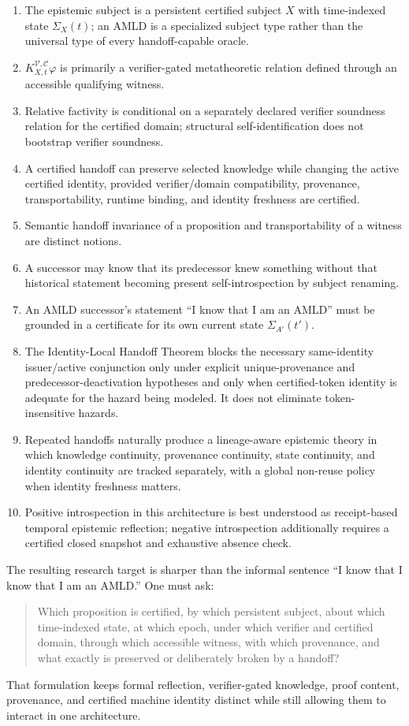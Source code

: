 \documentclass[11pt]{article}
\theoremstyle{remark}
\newcommand{\K}[4]{K^{#3,#4}_{#1,#2}}
\begin{document}
\begin{enumerate}[label=\textbf{C\arabic*.}]
\item The epistemic subject is a persistent certified subject $X$ with time-indexed state $\Sigma_X(t)$; an AMLD is a specialized subject type rather than the universal type of every handoff-capable oracle.
\item $\K{X}{t}{\mathcal V}{\mathcal C}\varphi$ is primarily a verifier-gated metatheoretic relation defined through an accessible qualifying witness.
\item Relative factivity is conditional on a separately declared verifier soundness relation for the certified domain; structural self-identification does not bootstrap verifier soundness.
\item A certified handoff can preserve selected knowledge while changing the active certified identity, provided verifier/domain compatibility, provenance, transportability, runtime binding, and identity freshness are certified.
\item Semantic handoff invariance of a proposition and transportability of a witness are distinct notions.
\item A successor may know that its predecessor knew something without that historical statement becoming present self-introspection by subject renaming.
\item An AMLD successor's statement ``I know that I am an AMLD'' must be grounded in a certificate for its own current state $\Sigma_{A'}(t')$.
\item The Identity-Local Handoff Theorem blocks the necessary same-identity issuer/active conjunction only under explicit unique-provenance and predecessor-deactivation hypotheses and only when certified-token identity is adequate for the hazard being modeled. It does not eliminate token-insensitive hazards.
\item Repeated handoffs naturally produce a lineage-aware epistemic theory in which knowledge continuity, provenance continuity, state continuity, and identity continuity are tracked separately, with a global non-reuse policy when identity freshness matters.
\item Positive introspection in this architecture is best understood as receipt-based temporal epistemic reflection; negative introspection additionally requires a certified closed snapshot and exhaustive absence check.
\end{enumerate}

The resulting research target is sharper than the informal sentence ``I know that I know that I am an AMLD.'' One must ask:
\begin{quote}
Which proposition is certified, by which persistent subject, about which time-indexed state, at which epoch, under which verifier and certified domain, through which accessible witness, with which provenance, and what exactly is preserved or deliberately broken by a handoff?
\end{quote}
That formulation keeps formal reflection, verifier-gated knowledge, proof content, provenance, and certified machine identity distinct while still allowing them to interact in one architecture.
\end{document}

